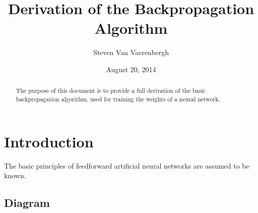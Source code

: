 \documentclass{article}
\begin{document}
\title{Derivation of the Backpropagation Algorithm}
\author{Steven Van Vaerenbergh}
\date{August 20, 2014}

\maketitle

\begin{abstract}
The purpose of this document is to provide a full derivation of the basic backpropagation algorithm, used for training the weights of a neural network.
\end{abstract}

\section{Introduction}

The basic principles of feedforward artificial neural networks are assumed to be known.

\subsection{Diagram}

\end{document}
